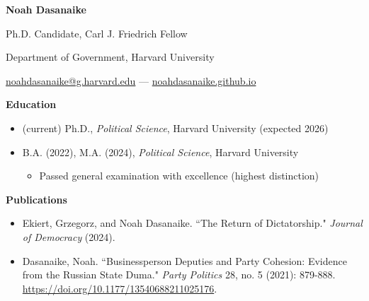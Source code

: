 \documentclass[12pt]{article}
\begin{document}
\begin{footnotesize} 

\begin{center}

{\bf {\large Noah Dasanaike}}

\vspace{3mm} 

Ph.D. Candidate, Carl J. Friedrich Fellow

Department of Government, Harvard University

\href{mailto:noahdasanaike@g.harvard.edu}{noahdasanaike@g.harvard.edu} — \href{https://noahdasanaike.github.io}{noahdasanaike.github.io}

\end{center}

\vspace{5mm} 


{\bf {\normalsize Education}}
\vspace{3mm} 

\begin{itemize}[noitemsep,nolistsep]
\item (current) Ph.D., \textit{Political Science}, Harvard University (expected 2026)
\item B.A. (2022), M.A. (2024), \textit{Political Science}, Harvard University
\vspace{-1.5mm}
\begin{itemize}
\item Passed general examination with excellence (highest distinction)
\end{itemize}
\end{itemize}

\vspace{5mm} 



{\bf {\normalsize Publications}}

\vspace{3mm} 

\begin{itemize}[noitemsep,nolistsep]

\item Ekiert, Grzegorz, and Noah Dasanaike. ``The Return of Dictatorship." \emph{Journal of Democracy} (2024).

\item Dasanaike, Noah. ``Businessperson Deputies and Party Cohesion: Evidence from the Russian State Duma." \emph{Party Politics} 28, no. 5 (2021): 879-888. \href{https://noahdasanaike.github.io/research/dasanaike_2021_duma.pdf}{https://doi.org/10.1177/13540688211025176}.


\end{itemize}
\end{footnotesize}
\end{document}
